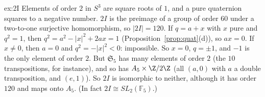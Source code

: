 \begin{solution}{ex:2I}
\idea Elements of order $2$ in $S^3$ are square roots of $1$, and a pure quaternion squares to a negative number.
\writeup $2I$ is the preimage of a group of order $60$ under a two-to-one surjective homomorphism, so $|2I|=120$. If $q=a+x$ with $x$ pure and $q^2=1$, then $q^2=a^2-|x|^2+2ax=1$ (Proposition~\ref{prop:quat}(d)), so $ax=0$. If $x\ne0$, then $a=0$ and $q^2=-|x|^2<0$: impossible. So $x=0$, $q=\pm1$, and $-1$ is the only element of order $2$. But $\mathfrak S_5$ has many elements of order $2$ (the $10$ transpositions, for instance), and so has $A_5\times\Z/2\Z$ (all $(a,0)$ with $a$ a double transposition, and $(e,1)$). So $2I$ is isomorphic to neither, although it has order $120$ and maps onto $A_5$. (In fact $2I\cong SL_2(\mathbb F_5)$.)
\end{solution}


